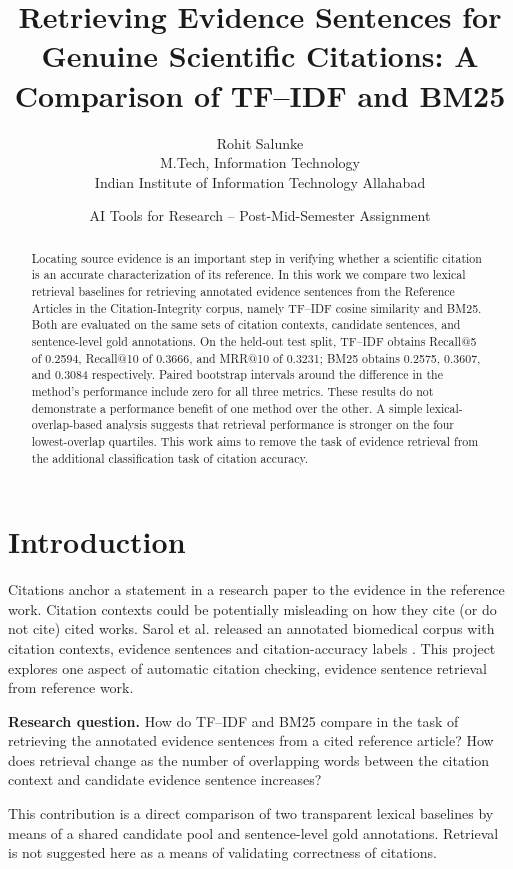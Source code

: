 \documentclass[11pt]{article}
\title{Retrieving Evidence Sentences for Genuine Scientific Citations: A Comparison of TF--IDF and BM25}
\author{Rohit Salunke\\M.Tech, Information Technology\\Indian Institute of Information Technology Allahabad}
\date{AI Tools for Research -- Post-Mid-Semester Assignment}
\begin{document}
\maketitle
\begin{abstract}
Locating source evidence is an important step in verifying whether a scientific citation is an accurate characterization of its reference. In this work we compare two lexical retrieval baselines for retrieving annotated evidence sentences from the Reference Articles in the Citation-Integrity corpus, namely TF--IDF cosine similarity and BM25. Both are evaluated on the same sets of citation contexts, candidate sentences, and sentence-level gold annotations. On the held-out test split, TF--IDF obtains Recall@5 of 0.2594, Recall@10 of 0.3666, and MRR@10 of 0.3231; BM25 obtains 0.2575, 0.3607, and 0.3084 respectively. Paired bootstrap intervals around the difference in the method's performance include zero for all three metrics. These results do not demonstrate a performance benefit of one method over the other. A simple lexical-overlap-based analysis suggests that retrieval performance is stronger on the four lowest-overlap quartiles. This work aims to remove the task of evidence retrieval from the additional classification task of citation accuracy.
\end{abstract}

\section{Introduction}
Citations anchor a statement in a research paper to the evidence in the reference work. Citation contexts could be potentially misleading on how they cite (or do not cite) cited works. Sarol et al. released an annotated biomedical corpus with citation contexts, evidence sentences and citation-accuracy labels \cite{sarol2024}. This project explores one aspect of automatic citation checking, evidence sentence retrieval from reference work.

\textbf{Research question.} How do TF--IDF and BM25 compare in the task of retrieving the annotated evidence sentences from a cited reference article? How does retrieval change as the number of overlapping words between the citation context and candidate evidence sentence increases?

This contribution is a direct comparison of two transparent lexical baselines by means of a shared candidate pool and sentence-level gold annotations. Retrieval is not suggested here as a means of validating correctness of citations.
\end{document}
